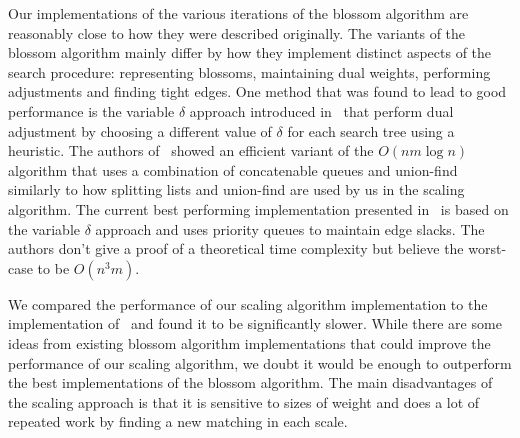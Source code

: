 Our implementations of the various iterations of the blossom algorithm are reasonably close to how they were described originally. The variants of the blossom algorithm mainly differ by how they implement distinct aspects of the search procedure: representing blossoms, maintaining dual weights, performing adjustments and finding tight edges. One method that was found to lead to good performance is the variable $\delta$ approach introduced in~\cite{cook1999computing} that perform dual adjustment by choosing a different value of $\delta$ for each search tree using a heuristic. The authors of~\cite{mehlhorn2002implementation} showed an efficient variant of the $O(nm \log n)$ algorithm that uses a combination of concatenable queues and union-find similarly to how splitting lists and union-find are used by us in the scaling algorithm. The current best performing implementation presented in~\cite{kolmogorov2009blossom} is based on the variable $\delta$ approach and uses priority queues to maintain edge slacks. The authors don't give a proof of a theoretical time complexity but believe the worst-case to be $O(n^3m)$.

We compared the performance of our scaling algorithm implementation to the implementation of~\cite{kolmogorov2009blossom} and found it to be significantly slower. While there are some ideas from existing blossom algorithm implementations that could improve the performance of our scaling algorithm, we doubt it would be enough to outperform the best implementations of the blossom algorithm. The main disadvantages of the scaling approach is that it is sensitive to sizes of weight and does a lot of repeated work by finding a new matching in each scale.
